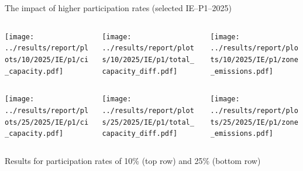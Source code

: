 \begin{frame}{The impact of higher participation rates (selected IE--P1--2025)}

  {\footnotesize

  \begin{columns}
  \begin{column}{5cm}
  \centering
  \texttt{[image: ../results/report/plots/10/2025/IE/p1/ci\_capacity.pdf]}
  \end{column}

  \begin{column}{5cm}
  \centering
  \texttt{[image: ../results/report/plots/10/2025/IE/p1/total\_capacity\_diff.pdf]}
  \end{column}

  \begin{column}{5cm}
  \centering
  \texttt{[image: ../results/report/plots/10/2025/IE/p1/zone\_emissions.pdf]}
  \end{column}

  \end{columns}

  \begin{columns}
    \begin{column}{5cm}
    \centering
    \texttt{[image: ../results/report/plots/25/2025/IE/p1/ci\_capacity.pdf]}
    \end{column}
  
    \begin{column}{5cm}
    \centering
    \texttt{[image: ../results/report/plots/25/2025/IE/p1/total\_capacity\_diff.pdf]}
    \end{column}
  
    \begin{column}{5cm}
    \centering
    \texttt{[image: ../results/report/plots/25/2025/IE/p1/zone\_emissions.pdf]}
    \end{column}

  \end{columns}

  \begin{columns}
    \begin{column}{15cm}
    {\scriptsize
    Results for participation rates of 10\% (top row) and 25\% (bottom row)
    }
    \end{column}
    \end{columns}
  }

\end{frame}




